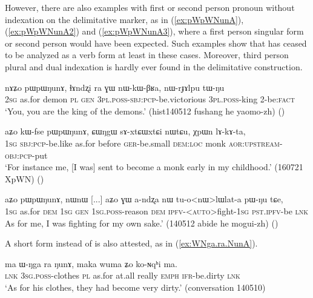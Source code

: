 However, there are also examples with first or second person pronoun without indexation on the delimitative marker, as in (\ref{ex:pWpWNunA}), (\ref{ex:pWpWNunA2}) and (\ref{ex:pWpWNunA3}), where a first person singular form  or second person  would have been expected. Such examples show that  has ceased to be analyzed as a verb form at least in these cases. Moreover, third person plural and dual indexation is hardly ever found in the delimitative construction.

\begin{exe}
\ex \label{ex:pWpWNunA}
\gll nɤʑo pɯpɯŋunɤ, ɬɤndʐi ra ɣɯ nɯ-kɯ-βʁa, nɯ-rɟɤlpu tɯ-ŋu \\
\textsc{2sg} as.for demon \textsc{pl} \textsc{gen} \textsc{3pl}.\textsc{poss}-\textsc{sbj}:\textsc{pcp}-be.victorious \textsc{3pl}.\textsc{poss}-king 2-be:\textsc{fact} \\
\glt `You, you are the king of the demons.' (hist140512 fushang he yaomo-zh)
()
\end{exe}

\begin{exe}
\ex \label{ex:pWpWNunA2}
\gll  aʑo kɯ-fse pɯpɯŋunɤ, ɕɯŋgɯ sɤ-xtɕɯ\redp{}xtɕi nɯtɕu, χpɯn lɤ-kɤ-ta, \\
\textsc{1sg} \textsc{sbj}:\textsc{pcp}-be.like as.for  before \textsc{ger}-be.small \textsc{dem}:\textsc{loc} monk \textsc{aor}:\textsc{upstream}-\textsc{obj}:\textsc{pcp}-put \\
\glt `For instance me, [I was] sent to become a monk early in my childhood.' (160721 XpWN) 	()
\end{exe}

\begin{exe}
\ex \label{ex:pWpWNunA3}
\gll aʑo pɯpɯŋunɤ, nɯnɯ [...] aʑo ɣɯ a-ndʐa nɯ tu-o<nɯ>lɯlat-a pɯ-ŋu tɕe, \\
\textsc{1sg} as.for \textsc{dem} { } \textsc{1sg} \textsc{gen} \textsc{1sg}.\textsc{poss}-reason \textsc{dem} \textsc{ipfv}-<\textsc{auto}>fight-\textsc{1sg} \textsc{pst}.\textsc{ipfv}-be \textsc{lnk} \\
\glt  As for me, I was fighting for my own sake.' (140512 abide he mogui-zh)
()
 \end{exe}
 
A short form  instead of  is also attested, as in (\ref{ex:WNga.ra.NunA}).

\begin{exe}
\ex \label{ex:WNga.ra.NunA}
\gll ma ɯ-ŋga ra ŋunɤ, maka wuma ʑo ko-ɴqʰi ma. \\
\textsc{lnk} \textsc{3sg}.\textsc{poss}-clothes \textsc{pl} as.for at.all really \textsc{emph} \textsc{ifr}-be.dirty \textsc{lnk} \\
\glt `As for his clothes, they had become very dirty.' (conversation 140510)
\end{exe}
 
